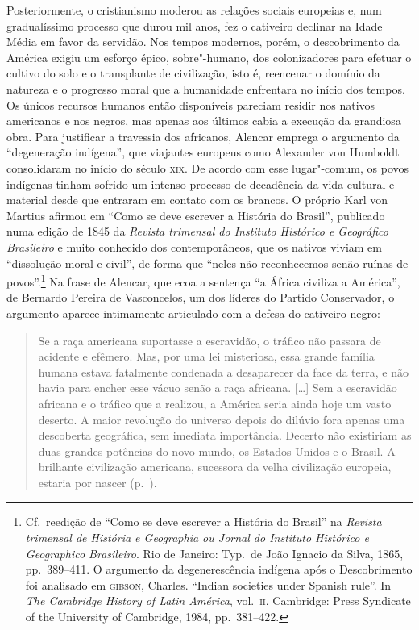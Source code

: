 Posteriormente, o cristianismo moderou as relações sociais europeias e,
num gradualíssimo processo que durou mil anos, fez o cativeiro
declinar na Idade Média em favor da servidão. Nos tempos modernos, porém, 
o descobrimento da América exigiu um esforço épico, sobre"-humano, dos 
colonizadores para efetuar o cultivo do solo e o transplante de civilização, 
isto é, reencenar o domínio da natureza e o progresso moral que 
a humanidade enfrentara no início dos tempos. Os únicos recursos humanos 
então disponíveis pareciam residir nos nativos americanos e nos negros, mas apenas 
aos últimos cabia a execução da grandiosa obra. Para justificar a travessia dos africanos,
Alencar emprega o argumento da ``degeneração indígena'', que
viajantes europeus como Alexander von Humboldt consolidaram no início
do século \textsc{xix}. De acordo com esse lugar"-comum, os povos indígenas
tinham sofrido um intenso processo de decadência da vida cultural e
material desde que entraram em contato com os brancos. O próprio Karl
von Martius afirmou em ``Como se deve escrever a História do Brasil'',
publicado numa edição de 1845 da \textit{Revista trimensal do
Instituto Histórico e Geográfico Brasileiro} e muito conhecido dos
contemporâneos, que os nativos viviam em ``dissolução moral e civil'', de
forma que ``neles não reconhecemos senão ruínas de povos''.\footnote{ Cf.~reedição 
de ``Como se deve escrever a História do Brasil'' na
\textit{Revista trimensal de História e Geographia ou Jornal do
Instituto Histórico e Geographico Brasileiro}. Rio de Janeiro: Typ.~de
João Ignacio da Silva, 1865, pp.~389--411. O argumento da degenerescência
indígena após o Descobrimento foi analisado em \textsc{gibson}, Charles.
``Indian societies under Spanish rule''. In \textit{The Cambridge History of
Latin América}, vol.~\textsc{ii}. Cambridge: Press Syndicate of the University of
Cambridge, 1984, pp.~381--422.} Na frase de Alencar, que ecoa a
sentença ``a África civiliza a América'', de Bernardo Pereira de
Vasconcelos, um dos líderes do Partido Conservador, o argumento aparece
intimamente articulado com a defesa do cativeiro negro: 

\begin{quote}
Se a raça americana suportasse a escravidão, o tráfico não passara de
acidente e efêmero. Mas, por uma lei misteriosa, essa grande família
humana estava fatalmente condenada a desaparecer da face da terra, e
não havia para encher esse vácuo senão a raça africana. [\ldots]
Sem a escravidão africana e o tráfico que a realizou, a América seria
ainda hoje um vasto deserto. A maior revolução do universo depois do
dilúvio fora apenas uma descoberta geográfica, sem imediata
importância. Decerto não existiriam as duas grandes potências do novo
mundo, os Estados Unidos e o Brasil. A brilhante civilização americana,
sucessora da velha civilização europeia, estaria por nascer (p.~\pageref{racaamericana}).
\end{quote}

